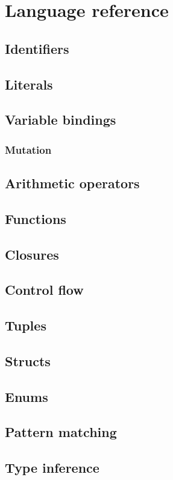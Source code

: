 \chapter{Language reference}\label{chapter:reference}

\section{Identifiers}\label{section:reference:identifiers}
\section{Literals}\label{section:reference:literals}
\section{Variable bindings}\label{section:reference:variable_bindings}
\subsection{Mutation}\label{section:reference:variable_bindings:mutation}
\section{Arithmetic operators}\label{section:reference:operators}
\section{Functions}\label{section:reference:functions}
\section{Closures}\label{section:reference:closures}
\section{Control flow}\label{section:reference:control_flow}
\section{Tuples}\label{section:reference:tuples}
\section{Structs}\label{section:reference:structs}
\section{Enums}\label{section:reference:enums}
\section{Pattern matching}\label{section:reference:pattern_matching}
\section{Type inference}\label{section:reference:type_inference}
